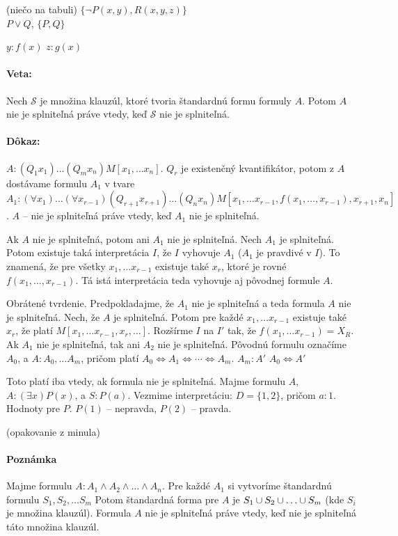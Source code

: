\par (niečo na tabuli)
$\{\neg P(x,y), R(x,y,z) \}$ \\
$P \lor Q$, $\{P, Q\}$

$y: f(x)$
$z: g(x)$

\paragraph{Veta:} Nech $\mathcal{S}$ je množina klauzúl, ktoré tvoria štandardnú
formu formuly $A$. Potom $A$ nie je splniteľná práve vtedy, keď $\mathcal{S}$
nie je splniteľná.

\paragraph{Dôkaz:} $A: (Q_1 x_1) \ldots (Q_m x_n) M[x_1, \ldots x_n]$. $Q_r$ je
existenčný kvantifikátor, potom z $A$ dostávame formulu $A_1$ v tvare $$A_1:
(\forall x_1) \ldots (\forall x_{r-1}) (Q_{r+1} x_{r+1})  \ldots (Q_n x_n)
M[x_1, \ldots x_{r-1}, f(x_1, \ldots, x_{r-1}), x_{r+1}, x_n]$$. $A$ -- nie je
splniteľná práve vtedy, keď $A_1$ nie je splniteľná.

\par Ak $A$ nie je splniteľná, potom ani $A_1$ nie je splniteľná. Nech $A_1$ je
splniteľná. Potom existuje taká interpretácia $I$, že $I$ vyhovuje $A_1$ ($A_1$
je pravdivé v $I$). To znamená, že pre všetky $x_1 , \ldots x_{r-1}$ existuje
také $x_r$, ktoré je rovné $f(x_1, \ldots, x_{r-1})$. Tá istá interpretácia teda
vyhovuje aj pôvodnej formule $A$.

\par Obrátené tvrdenie. Predpokladajme, že $A_1$ nie je splniteľná a teda
formula $A$ nie je splniteľná. Nech, že $A$ je splniteľná. Potom pre každé $x_1,
\ldots x_{r-1}$ existuje také $x_r$, že platí $M[x_1, \ldots x_{r-1}, x_r,
\ldots]$. Rozšírme $I$ na $I'$ tak, že $f(x_1, \ldots x_{r-1}) = X_R$. Ak $A_1$
nie je splniteľná, tak ani $A_2$ nie je splniteľná. Pôvodnú formulu označíme
$A_0$, a $A: A_0, \ldots A_m$, pričom platí $A_0 \iff A_1 \iff \cdots \iff A_m$.
$A_m: A'$
$A_0 \iff A'$


\par Toto platí iba vtedy, ak formula nie je splniteľná. Majme formulu $A$, $A:
(\exists x) P(x)$, a $S: P(a)$. Vezmime interpretáciu: $D = \{1, 2 \}$, pričom
$a: 1$. Hodnoty pre $P$. $P(1)$ -- nepravda, $P(2)$ -- pravda.

(opakovanie z minula) 

\paragraph{Poznámka} Majme formulu $A: A_1 \land A_2 \land \ldots \land A_n$.
Pre každé $A_1$ si vytvoríme štandardnú formulu $S_1, S_2, \ldots S_m$ Potom
štandardná forma pre $A$ je $S_1 \cup S_2 \cup \ldots \cup S_m$ (kde $S_i$
je množina klauzúl). Formula $A$ nie je splniteľná práve vtedy, keď nie je
splniteľná táto množina klauzúl.

